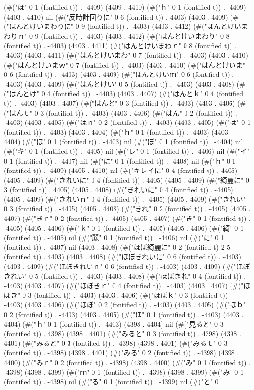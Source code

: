 (#("ほ" 0 1 (fontified t)) . -4409) (4409 . 4410) (#("ｈ" 0 1 (fontified t)) . -4409) (4403 . 4410) nil (#("反時計回りに" 0 6 (fontified t)) . 4403) (4403 . 4409) (#("はんとけいまわりに" 0 9 (fontified t)) . -4403) (4403 . 4412) (#("はんとけいまわりｎ" 0 9 (fontified t)) . -4403) (4403 . 4412) (#("はんとけいまわり" 0 8 (fontified t)) . -4403) (4403 . 4411) (#("はんとけいまわｒ" 0 8 (fontified t)) . -4403) (4403 . 4411) (#("はんとけいまわ" 0 7 (fontified t)) . -4403) (4403 . 4410) (#("はんとけいまｗ" 0 7 (fontified t)) . -4403) (4403 . 4410) (#("はんとけいま" 0 6 (fontified t)) . -4403) (4403 . 4409) (#("はんとけいｍ" 0 6 (fontified t)) . -4403) (4403 . 4409) (#("はんとけい" 0 5 (fontified t)) . -4403) (4403 . 4408) (#("はんとけ" 0 4 (fontified t)) . -4403) (4403 . 4407) (#("はんとｋ" 0 4 (fontified t)) . -4403) (4403 . 4407) (#("はんと" 0 3 (fontified t)) . -4403) (4403 . 4406) (#("はんｔ" 0 3 (fontified t)) . -4403) (4403 . 4406) (#("はん" 0 2 (fontified t)) . -4403) (4403 . 4405) (#("はｎ" 0 2 (fontified t)) . -4403) (4403 . 4405) (#("は" 0 1 (fontified t)) . -4403) (4403 . 4404) (#("ｈ" 0 1 (fontified t)) . -4403) (4403 . 4404) (#("ほ" 0 1 (fontified t)) . -4403) nil (#("ぼ" 0 1 (fontified t)) . -4404) nil (#("キ" 0 1 (fontified t)) . -4405) nil (#("レ" 0 1 (fontified t)) . -4406) nil (#("イ" 0 1 (fontified t)) . -4407) nil (#("に" 0 1 (fontified t)) . -4408) nil (#("ｈ" 0 1 (fontified t)) . -4409) (4405 . 4410) nil (#("キレイに" 0 4 (fontified t)) . 4405) (4405 . 4409) (#("きれいに" 0 4 (fontified t)) . 4405) (4405 . 4409) (#("綺麗に" 0 3 (fontified t)) . 4405) (4405 . 4408) (#("きれいに" 0 4 (fontified t)) . -4405) (4405 . 4409) (#("きれいｎ" 0 4 (fontified t)) . -4405) (4405 . 4409) (#("きれい" 0 3 (fontified t)) . -4405) (4405 . 4408) (#("きれ" 0 2 (fontified t)) . -4405) (4405 . 4407) (#("きｒ" 0 2 (fontified t)) . -4405) (4405 . 4407) (#("き" 0 1 (fontified t)) . -4405) (4405 . 4406) (#("ｋ" 0 1 (fontified t)) . -4405) (4405 . 4406) (#("綺" 0 1 (fontified t)) . -4405) nil (#("麗" 0 1 (fontified t)) . -4406) nil (#("に" 0 1 (fontified t)) . -4407) nil (4403 . 4408) (#("ほぼ綺麗に" 0 2 (fontified t) 2 5 (fontified t)) . 4403) (4403 . 4408) (#("ほぼきれいに" 0 6 (fontified t)) . -4403) (4403 . 4409) (#("ほぼきれいｎ" 0 6 (fontified t)) . -4403) (4403 . 4409) (#("ほぼきれい" 0 5 (fontified t)) . -4403) (4403 . 4408) (#("ほぼきれ" 0 4 (fontified t)) . -4403) (4403 . 4407) (#("ほぼきｒ" 0 4 (fontified t)) . -4403) (4403 . 4407) (#("ほぼき" 0 3 (fontified t)) . -4403) (4403 . 4406) (#("ほぼｋ" 0 3 (fontified t)) . -4403) (4403 . 4406) (#("ほぼ" 0 2 (fontified t)) . -4403) (4403 . 4405) (#("ほｂ" 0 2 (fontified t)) . -4403) (4403 . 4405) (#("ほ" 0 1 (fontified t)) . -4403) (4403 . 4404) (#("ｈ" 0 1 (fontified t)) . -4403) (4398 . 4404) nil (#("見ると" 0 3 (fontified t)) . 4398) (4398 . 4401) (#("みると" 0 3 (fontified t)) . 4398) (4398 . 4401) (#("みると" 0 3 (fontified t)) . -4398) (4398 . 4401) (#("みるｔ" 0 3 (fontified t)) . -4398) (4398 . 4401) (#("みる" 0 2 (fontified t)) . -4398) (4398 . 4400) (#("みｒ" 0 2 (fontified t)) . -4398) (4398 . 4400) (#("み" 0 1 (fontified t)) . -4398) (4398 . 4399) (#("ｍ" 0 1 (fontified t)) . -4398) (4398 . 4399) (#("み" 0 1 (fontified t)) . -4398) nil (#("る" 0 1 (fontified t)) . -4399) nil (#("と" 0 